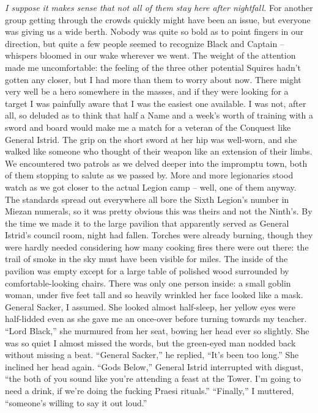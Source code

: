 \documentclass[12pt, openany]{book}
\begin{document}
\textit{I suppose it makes sense that not all of them stay here after nightfall.} For another group getting through the crowds quickly might have been an issue, but everyone was giving us a wide berth. Nobody was quite so bold as to point fingers in our direction, but quite a few people seemed to recognize Black and Captain – whispers bloomed in our wake wherever we went. The weight of the attention made me uncomfortable: the feeling of the three other potential Squires hadn’t gotten any closer, but I had more than them to worry about now. There might very well be a hero somewhere in the masses, and if they were looking for a target I was painfully aware that I was the easiest one available. I was not, after all, so deluded as to think that half a Name and a week’s worth of training with a sword and board would make me a match for a veteran of the Conquest like General Istrid. The grip on the short sword at her hip was well-worn, and she walked like someone who thought of their weapon like an extension of their limbs.
We encountered two patrols as we delved deeper into the impromptu town, both of them stopping to salute as we passed by. More and more legionaries stood watch as we got closer to the actual Legion camp – well, one of them anyway. The standards spread out everywhere all bore the Sixth Legion’s number in Miezan numerals, so it was pretty obvious this was theirs and not the Ninth’s. By the time we made it to the large pavilion that apparently served as General Istrid’s council room, night had fallen. Torches were already burning, though they were hardly needed considering how many cooking fires there were out there: the trail of smoke in the sky must have been visible for miles. The inside of the pavilion was empty except for a large table of polished wood surrounded by comfortable-looking chairs. There was only one person inside: a small goblin woman, under five feet tall and so heavily wrinkled her face looked like a mask. General Sacker, I assumed. She looked almost half-sleep, her yellow eyes were half-lidded even as she gave me an once-over before turning towards my teacher.
“Lord Black,” she murmured from her seat, bowing her head ever so slightly.
She was so quiet I almost missed the words, but the green-eyed man nodded back without missing a beat.
“General Sacker,” he replied, “It’s been too long.”
She inclined her head again.
“Gods Below,” General Istrid interrupted with disgust, “the both of you sound like you’re attending a feast at the Tower. I’m going to need a drink, if we’re doing the fucking Praesi rituals.”
“Finally,” I muttered, “someone’s willing to say it out loud.”
\end{document}
